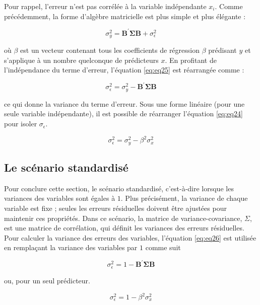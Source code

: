 \documentclass[
]{book}
\begin{document}
Pour rappel, l'erreur n'est pas corrélée à la variable indépendante \(x_i\). Comme précédemment, la forme d'algèbre matricielle est plus simple et plus élégante :

\begin{equation}
\sigma_y^2 = \mathbf{B}^{\prime} \mathbf{\Sigma} \mathbf{B} + \sigma_\epsilon^2
\label{eq:eq25}
\end{equation}

où \(\beta\) est un vecteur contenant tous les coefficients de régression \(\beta\) prédisant \(y\) et s'applique à un nombre quelconque de prédicteurs \(x\). En profitant de l'indépendance du terme d'erreur, l'équation \eqref{eq:eq25} est réarrangée comme :

\begin{equation}
\sigma_\epsilon^2=\sigma_y^2 -\mathbf{B}^{\prime} \mathbf{\Sigma} \mathbf{B}
\label{eq:eq26}
\end{equation}

ce qui donne la variance du terme d'erreur. Sous une forme linéaire (pour une seule variable indépendante), il est possible de réarranger l'équation \eqref{eq:eq24} pour isoler \(\sigma_\epsilon\).

\[
\sigma_\epsilon^2=\sigma_y^2-\beta^2 \sigma_x^2
\]

\hypertarget{le-scuxe9nario-standardisuxe9}{%
\subsection{Le scénario standardisé}\label{le-scuxe9nario-standardisuxe9}}

Pour conclure cette section, le scénario standardisé, c'est-à-dire lorsque les variances des variables sont égales à \(1\). Plus précisément, la variance de chaque variable est fixe ; seules les erreurs résiduelles doivent être ajustées pour maintenir ces propriétés. Dans ce scénario, la matrice de variance-covariance, \(\Sigma\), est une matrice de corrélation, qui définit les variances des erreurs résiduelles. Pour calculer la variance des erreurs des variables, l'équation \eqref{eq:eq26} est utilisée en remplaçant la variance des variables par \(1\) comme suit

\begin{equation}
\sigma_\epsilon^2=1 - \mathbf{B}^{\prime} \mathbf{\Sigma} \mathbf{B}
\label{eq:eq28}
\end{equation}

ou, pour un seul prédicteur.

\begin{equation}
\sigma_\epsilon^2=1-\beta^2 \sigma_x^2
\label{eq:eq29}
\end{equation}
\end{document}
